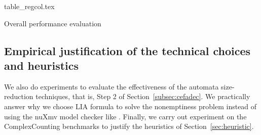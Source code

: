 \begin{table}
  \centering\vskip 0pt
    {table_regcol.tex}
    \caption{Overall performance evaluation}
  \label{fig:table_overall_eval}
\end{table}





\subsection{Empirical justification of the technical choices and heuristics}\label{subsec:size_reduction_eval}
We also do experiments to evaluate the effectiveness of the automata size-reduction techniques, that is, Step 2 of Section~\ref{subsec:cefadec}. We practically answer why we choose LIA formula to solve the nonemptiness problem instead of using the nuXmv model checker like \cite{atva2020}. Finally, we carry out experiment on the ComplexCounting benchmarks to justify the heuristics of Section~\ref{sec:heuristic}.
